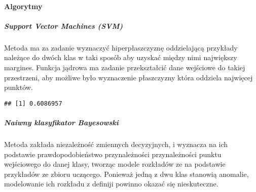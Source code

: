 \documentclass[
]{article}
\newenvironment{Shaded}{\begin{snugshade}}{\end{snugshade}}
\newcommand{\DataTypeTok}[1]{\textcolor[rgb]{0.13,0.29,0.53}{#1}}
\newcommand{\KeywordTok}[1]{\textcolor[rgb]{0.13,0.29,0.53}{\textbf{#1}}}
\newcommand{\NormalTok}[1]{#1}
\newcommand{\OperatorTok}[1]{\textcolor[rgb]{0.81,0.36,0.00}{\textbf{#1}}}
\newcommand{\OtherTok}[1]{\textcolor[rgb]{0.56,0.35,0.01}{#1}}
\newcommand{\StringTok}[1]{\textcolor[rgb]{0.31,0.60,0.02}{#1}}
\begin{document}
\hypertarget{algorytmy}{%
\paragraph{Algorytmy}\label{algorytmy}}

\hypertarget{support-vector-machines-svm}{%
\subparagraph{Support Vector Machines
(SVM)}\label{support-vector-machines-svm}}

Metoda ma za zadanie wyznaczyć hiperpłaszczyznę oddzielającą przykłady
należące do dwóch klas w taki sposób aby uzyskać między nimi największy
margines. Funkcja jądrowa ma zadanie przekształcić dane wejściowe do
takiej przestrzeni, aby możliwe było wyznaczenie płaszczyzny która
oddziela najwięcej punktów.

\begin{Shaded}
\end{Shaded}

\begin{verbatim}
## [1] 0.6086957
\end{verbatim}

\hypertarget{naiwny-klasyfikator-bayesowski}{%
\subparagraph{Naiwny klasyfikator
Bayesowski}\label{naiwny-klasyfikator-bayesowski}}

Metoda zakłada niezależność zmiennych decyzyjnych, i wyznacza na ich
podstawie prawdopodobieństwo przynależności przynależności punktu
wejściowego do danej klasy, tworząc modele rozkładów ze na podstawie
przykładów ze zbioru uczącego. Ponieważ jedną z dwu klas stanowią
anomalie, modelowanie ich rozkładu z definiji powinno okazać się
nieskuteczne.

\begin{Shaded}
\end{Shaded}
\end{document}
